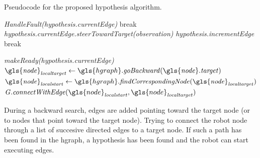 \begin{algorithm}[H]
  \caption{Pseudocode for the proposed hypothesis algorithm.}\label{pseudocode:halgorithm}
  \begin{algorithmic}[1]

    \hspace{-0.9cm}\colorbox{my_grey}{\parbox{\linewidth}{%

        \hspace{-0.1cm}\colorbox{my_yellow}{\parbox{\linewidth}{%

            \hspace{-0.1cm}\colorbox{my_light_blue}{\parbox{\linewidth}{%
                 
                \State \textit{HandleFault(\gls{hypothesis}.currentEdge)}
                \State break
                \EndIf
                \State \textit{\gls{hypothesis}.currentEdge.steerTowardTarget(\gls{observation})}
                  \State \textit{\gls{hypothesis}.incrementEdge}
                \Else
                  \State break
                \EndIf
                \EndIf
                \EndWhile
            }}
            \Else
            \State \textit{makeReady(\gls{hypothesis}.currentEdge)}
            \EndIf
            \Else
            \State $\mathit{\gls{node}_{localtarget}} \leftarrow \gls{hgraph}.\mathit{goBackward(\gls{node}.target)}$
            \State $\mathit{\gls{node}_{localstart}} \leftarrow \gls{hgraph}.\mathit{findCorrespondingNode(\gls{node}_{localtarget})}$ 
            \State $\mathit{G.connectWithEdge}(\gls{node}_\mathit{localstart}, \gls{node}_\mathit{localtarget})$
            \EndIf
            \EndWhile
        }}
        \EndFor
    }}
  \end{algorithmic}
\end{algorithm}

During a backward search, edges are added pointing toward the target node (or to nodes that point toward the target node). Trying to connect the robot node through a list of succesive directed edges to a target node. If such a path has been found in the \ac{hgraph}, a hypothesis has been found and the robot can start executing edges.


